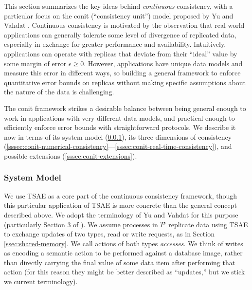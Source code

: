 \documentclass[]             %
{NASA}                       %
\theoremstyle{definition}
\begin{document}
This section summarizes the key ideas behind \emph{continuous}
consistency, with a particular focus on the conit (``consistency
unit'') model proposed by Yu and Vahdat
\cite{2000tact,2000tactalgorithms,10.5555/1251229.1251250,DBLP:conf/icdcs/YuV01,2002tact}. Continuous
consistency is motivated by the observation that real-world
applications can generally tolerate some level of divergence of
replicated data, especially in exchange for greater performance and
availability. Intuitively, applications can operate with replicas that
deviate from their ``ideal'' value by some margin of error
$\epsilon \geq 0$. However, applications have unique data models and
measure this error in different ways, so building a general framework
to enforce quantitative error bounds on replicas without making
specific assumptions about the nature of the data is challenging.

The conit framework strikes a desirable balance between being general
enough to work in applications with very different data models, and
practical enough to efficiently enforce error bounds with
straightforward protocols. We describe it now in terms of its system
model (\ref{sssec:conit-system-model}), its three dimensions of
consistency
(\ref{sssec:conit-numerical-consistency}---\ref{sssec:conit-real-time-consistency}),
and possible extensions (\ref{sssec:conit-extensions}).


\subsubsection{System Model}
\label{sssec:conit-system-model}
We use TSAE as a core part of the continuous consistency framework,
though this particular application of TSAE is more concrete than the
general concept described above. We adopt the terminology of Yu and
Vahdat for this purpose (particularly Section 3 of
\cite{2002tact}). We assume processes in $\mathcal{P}$ replicate data
using TSAE to exchange updates of two types, read or write requests,
as in Section \ref{ssec:shared-memory}. We call actions of both types
\emph{accesses}. We think of writes as encoding a semantic action to
be performed against a database image, rather than directly carrying
the final value of some data item after performing that action (for
this reason they might be better described as ``updates,'' but we
stick we current terminology).
\end{document}
